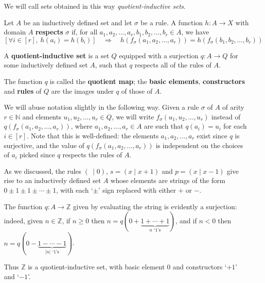 We will call sets obtained in this way \textit{quotient-inductive sets}.

\begin{definition}
\label{defFunctionRespectsRule}
Let $A$ be an inductively defined set and let $\sigma$ be a rule. A function $h : A \to X$ with domain $A$ \textbf{respects} $\sigma$ if, for all $a_1,a_2,\dots,a_r,b_1,b_2,\dots,b_r \in A$, we have
\[ [\forall i \in [r],~ h(a_i) = h(b_i)] \quad \Rightarrow \quad h(f_{\sigma}(a_1,a_2,\dots,a_r)) = h(f_{\sigma}(b_1,b_2,\dots,b_r)) \]
\end{definition}


\begin{definition}
\label{defQuotientInductiveSet}
A \textbf{quotient-inductive set} is a set $Q$ equipped with a surjection $q : A \to Q$ for some inductively defined set $A$, such that $q$ respects all of the rules of $A$.

The function $q$ is called the \textbf{quotient map}; the \textbf{basic elements}, \textbf{constructors} and \textbf{rules} of $Q$ are the images under $q$ of those of $A$.
\end{definition}

We will abuse notation slightly in the following way. Given a rule $\sigma$ of $A$ of arity $r \in \mathbb{N}$ and elements $u_1,u_2,\dots,u_r \in Q$, we will write $f_{\sigma}(u_1,u_2,\dots,u_r)$ instead of $q(f_{\sigma}(a_1,a_2,\dots,a_r))$, where $a_1,a_2,\dots,a_r \in A$ are such that $q(a_i) = u_i$ for each $i \in [r]$. Note that this is well-defined: the elements $a_1,a_2,\dots,a_r$ exist since $q$ is surjective, and the value of $q(f_{\sigma}(a_1,a_2,\dots,a_r))$ is independent on the choices of $a_i$ picked since $q$ respects the rules of $A$.

\begin{example}
As we discussed, the rules $(~ \mid 0)$, $s = (x \mid x+1)$ and $p = (x \mid x-1)$ give rise to an inductively defined set $A$ whose elements are strings of the form $0 \pm 1 \pm 1 \pm \cdots \pm 1$, with each `$\pm$' sign replaced with either $+$ or $-$.

The function $q : A \to \mathbb{Z}$ given by evaluating the string is evidently a surjection: indeed, given $n \in \mathbb{Z}$, if $n \ge 0$ then $n = q(0+\underbrace{1+\cdots+1}_{\text{$n$ `$1$'s}})$, and if $n < 0$ then $n = q(0-\underbrace{1-\cdots-1}_{\text{$|n|$ `$1$'s}})$.

Thus $\mathbb{Z}$ is a quotient-inductive set, with basic element $0$ and constructors `$+1$' and `$-1$'.
\end{example}

